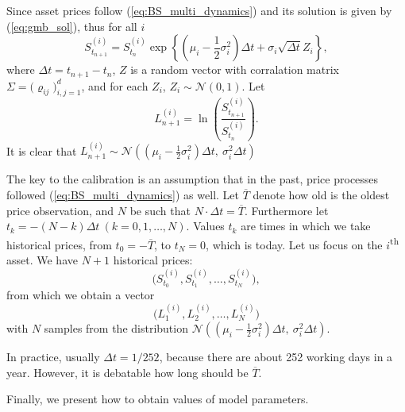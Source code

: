 \documentclass[a4paper,11pt, twoside]{book}
\theoremstyle{definition}
\theoremstyle{remark}
\begin{document}
Since asset prices follow (\ref{eq:BS_multi_dynamics}) and its solution is given by (\ref{eq:gmb_sol}), thus for all $i$
\[  S^{(i)}_{t_{n+1}} = S^{(i)}_{t_n} \exp\left\{ (\mu_i - \frac{1}{2}\sigma_i^2)\Delta t + \sigma_i \sqrt{\Delta t} Z_i \right\}, \]
where $\Delta t = t_{n+1} - t_n$, $Z$ is a random vector with corralation matrix $\Sigma = \bigl( \varrho_{ij} \bigr)_{i,j=1}^d$, and for each $Z_i$, $Z_i \sim \mathcal{N}(0,1)$. Let
\[  L^{(i)}_{n+1} = \ln\left( \frac{S^{(i)}_{t_{n+1}}}{S^{(i)}_{t_n}} \right). \]
It is clear that $ L^{(i)}_{n+1} \sim \mathcal{N}\left(  (\mu_i - \frac{1}{2}\sigma_i^2)\Delta t,\ \sigma_i^2 \Delta t \right)$

The key to the calibration is an assumption that in the past, price processes followed (\ref{eq:BS_multi_dynamics}) as well. Let $\overline{T}$ denote how old is the oldest price observation, and $N$ be such that $N \cdot \Delta t = \overline{T}$. Furthermore let $t_k = -(N-k)\Delta t\ (k=0,1,\ldots,N)$. Values $t_k$ are times in which we take historical prices, from $t_0 = -\overline{T}$, to $t_N = 0$, which is today. Let us focus on the $i$\textsuperscript{th} asset. We have $N+1$ historical prices:
\[  \bigl( S^{(i)}_{t_0}, S^{(i)}_{t_1}, \ldots,S^{(i)}_{t_N} \bigr), \]
from which we obtain a vector
\[ \bigl( L^{(i)}_{1}, L^{(i)}_{2}, \ldots, L^{(i)}_{N} \bigr) \]
with $N$ samples from the distribution $\mathcal{N}\left(  (\mu_i - \frac{1}{2}\sigma_i^2)\Delta t,\ \sigma_i^2 \Delta t \right)$.

In practice, usually $\Delta t = 1/252$, because there are about 252 working days in a year. However, it is debatable how long should be $\overline{T}$. 

Finally, we present how to obtain values of model parameters.
\end{document}
